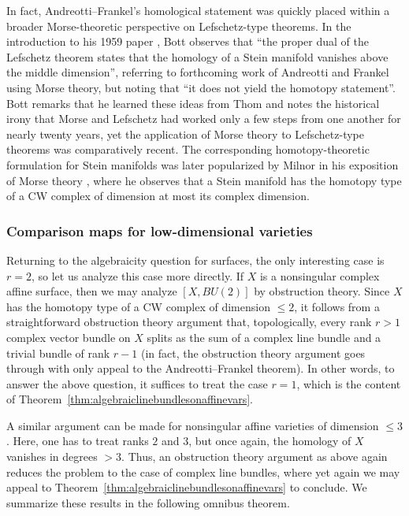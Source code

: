 \documentclass[11pt,leqno]{article}
\renewcommand{\1}{{\rm 1\hspace*{-0.4ex}%
\rule{0.1ex}{1.52ex}\hspace*{0.2ex}}}
\newcommand{\<}[1]{{\langle}#1 {\rangle}}
\newcounter{intro}
\theoremstyle{plain}
\theoremstyle{definition}
\theoremstyle{remark}
\numberwithin{equation}{subsection}
\begin{document}
In fact, Andreotti--Frankel's homological statement was quickly placed within a broader Morse-theoretic perspective on Lefschetz-type theorems. In the introduction to his 1959 paper \cite{Bott1959Lefschetz}, Bott observes that ``the proper dual of the Lefschetz theorem states that the homology of a Stein manifold vanishes above the middle dimension'', referring to forthcoming work of Andreotti and Frankel using Morse theory, but noting that ``it does not yield the homotopy statement''. Bott remarks that he learned these ideas from Thom and notes the historical irony that Morse and Lefschetz had worked only a few steps from one another for nearly twenty years, yet the application of Morse theory to Lefschetz-type theorems was comparatively recent. The corresponding homotopy-theoretic formulation for Stein manifolds was later popularized by Milnor in his exposition of Morse theory \cite[Theorem~7.2]{Milnor1963}, where he observes that a Stein manifold has the homotopy type of a CW complex of dimension at most its complex dimension.


\subsubsection*{Comparison maps for low-dimensional varieties}
Returning to the algebraicity question for surfaces, the only interesting case is $r = 2$, so let us analyze this case more directly.  If $X$ is a nonsingular complex affine surface, then we may analyze $[X,BU(2)]$ by obstruction theory.  Since $X$ has the homotopy type of a CW complex of dimension $\leq 2$, it follows from a straightforward obstruction theory argument that, topologically, every rank $r > 1$ complex vector bundle on $X$ splits as the sum of a complex line bundle and a trivial bundle of rank $r-1$ (in fact, the obstruction theory argument goes through with only appeal to the Andreotti--Frankel theorem).  In other words, to answer the above question, it suffices to treat the case $r = 1$, which is the content of Theorem~\ref{thm:algebraiclinebundlesonaffinevars}.  

A similar argument can be made for nonsingular affine varieties of dimension $\leq 3$.  Here, one has to treat ranks $2$ and $3$, but once again, the homology of $X$ vanishes in degrees $> 3$.  Thus, an obstruction theory argument as above again reduces the problem to the case of complex line bundles, where yet again we may appeal to Theorem~\ref{thm:algebraiclinebundlesonaffinevars} to conclude.  We summarize these results in the following omnibus theorem.
\end{document}
